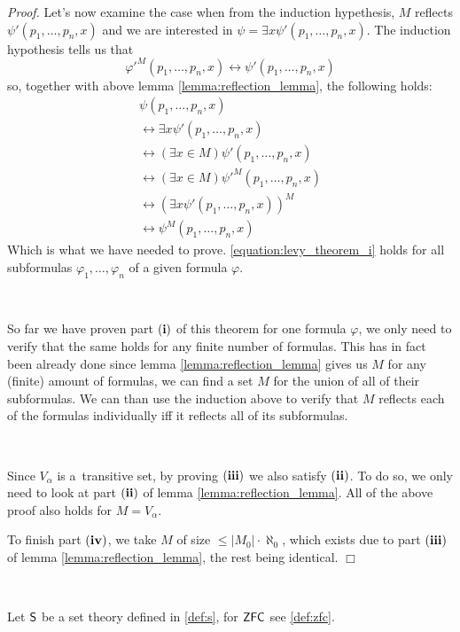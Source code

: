 \documentclass[12pt,a4paper]{article}
\newenvironment{proof}
{\noindent \textit{Proof.}}
{\hspace*{\fill} $\Box$}
\renewcommand{\iff}{\leftrightarrow}
\begin{document}
\begin{proof}
Let's now examine the case when from the induction hypethesis, $M$ reflects $\psi'(p_1, \ldots, p_n, x)$ and we are interested in $\psi = \exists x \psi'(p_1, \ldots, p_n, x)$.
The induction hypothesis tells us that 
\begin{equation}
\varphi'^M(p_1, \ldots, p_n, x) \iff \psi'(p_1, \ldots, p_n, x)
\end{equation}
so, together with above lemma \ref{lemma:reflection_lemma}, the following holds:
\begin{equation}
\begin{gathered}
\psi(p_1, \ldots, p_n, x) \\
\iff \exists x \psi'(p_1, \ldots, p_n, x) \\
\iff (\exists x \in M) \psi'(p_1, \ldots, p_n, x) \\
\iff (\exists x \in M) \psi'^M (p_1, \ldots, p_n, x) \\
\iff (\exists x \psi'(p_1, \ldots, p_n, x))^M \\
\iff \psi^M(p_1, \ldots, p_n, x)
\end{gathered}
\end{equation}
Which is what we have needed to prove. \ref{equation:levy_theorem_i} holds for all subformulas $\varphi_1, \ldots, \varphi_n$ of a given formula $\varphi$.

\

So far we have proven part $\bold{(i)}$ of this theorem for one formula $\varphi$, we only need to verify that the same holds for any finite number of formulas. This has in fact been already done since lemma \ref{lemma:reflection_lemma} gives us $M$ for any (finite) amount of formulas, we can find a set $M$ for the union of all of their subformulas. We can than use the induction above  to verify that $M$ reflects each of the formulas individually iff it reflects all of its subformulas.

\

Since $V_\alpha$ is a~transitive set, by proving $\bold{(iii)}$ we also satisfy $\bold{(ii)}$. To do so, we only need to look at part $\bold{(ii)}$ of lemma \ref{lemma:reflection_lemma}. All of the above proof also holds for $M = V_\alpha$. 

To finish part $\bold{(iv)}$, we take $M$ of size $\leq |M_0| \cdot \aleph_0$, which exists due to part $\bold{(iii)}$ of lemma \ref{lemma:reflection_lemma}, the rest being identical.
\end{proof}

\

Let $\sf{S}$ be a set theory defined in \ref{def:s}, for $\sf{ZFC}$ see \ref{def:zfc}.
\end{document}
